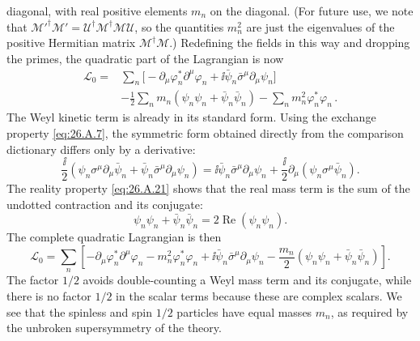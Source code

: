 diagonal, with real positive elements \(m_n\) on the diagonal. (For future
use, we note that
\(\mathcal{M}'^\dagger\mathcal{M}'=
\mathcal{U}^\dagger\mathcal{M}^\dagger\mathcal{M}\mathcal{U}\), so the
quantities \(m_n^2\) are just the eigenvalues of the positive Hermitian matrix
\(\mathcal{M}^\dagger\mathcal{M}\).) Redefining the fields in this way and
dropping the primes, the quadratic part of the Lagrangian is now
\begin{equation}
  \begin{aligned}
  \mathcal{L}_0={}&
  \sum_n\biggl[
    -\partial_\mu\varphi_n^*\partial^\mu\varphi_n
    +\ii\bar\psi_n\bar\sigma^\mu\partial_\mu\psi_n
  \biggr]
  \\
  &-\frac12\sum_n m_n(\psi_n\psi_n+\bar\psi_n\bar\psi_n)
  -\sum_n m_n^2\varphi_n^*\varphi_n\,.
  \end{aligned}
  \tag{26.4.14}\label{eq:26.4.14}
\end{equation}
The Weyl kinetic term is already in its standard form.  Using the exchange
property \eqref{eq:26.A.7}, the symmetric form
obtained directly from the comparison dictionary differs only by a
derivative:
\[
  \frac{\ii}{2}\left(
    \psi_n\sigma^\mu\partial_\mu\bar\psi_n
    +\bar\psi_n\bar\sigma^\mu\partial_\mu\psi_n\right)
  =\ii\bar\psi_n\bar\sigma^\mu\partial_\mu\psi_n
  +\frac{\ii}{2}\partial_\mu(\psi_n\sigma^\mu\bar\psi_n).
\]
The reality property \eqref{eq:26.A.21} shows that the real mass term is the
sum of the undotted contraction and its conjugate:
\[
  \psi_n\psi_n+\bar\psi_n\bar\psi_n
  =2\operatorname{Re}(\psi_n\psi_n).
\]
The complete quadratic Lagrangian is then
\begin{equation}
  \mathcal{L}_0
  =\sum_n\left[
    -\partial_\mu\varphi_n^*\partial^\mu\varphi_n
    -m_n^2\varphi_n^*\varphi_n
    +\ii\bar\psi_n\bar\sigma^\mu\partial_\mu\psi_n
    -\frac{m_n}{2}(\psi_n\psi_n+\bar\psi_n\bar\psi_n)
  \right].
  \tag{26.4.15}\label{eq:26.4.15}
\end{equation}
The factor \(1/2\) avoids double-counting a Weyl mass term and its conjugate,
while there is no factor \(1/2\) in the scalar terms because these are
complex scalars. We see that the spinless and spin \(1/2\) particles
have equal masses \(m_n\), as required by the unbroken supersymmetry of the
theory.

